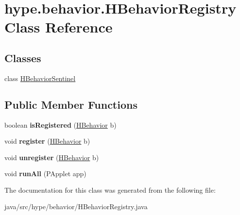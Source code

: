 \hypertarget{classhype_1_1behavior_1_1_h_behavior_registry}{\section{hype.\-behavior.\-H\-Behavior\-Registry Class Reference}
\label{classhype_1_1behavior_1_1_h_behavior_registry}
}
\subsection*{Classes}
\begin{DoxyCompactItemize}
\item 
class \hyperlink{classhype_1_1behavior_1_1_h_behavior_registry_1_1_h_behavior_sentinel}{H\-Behavior\-Sentinel}
\end{DoxyCompactItemize}
\subsection*{Public Member Functions}
\begin{DoxyCompactItemize}
\item 
\hypertarget{classhype_1_1behavior_1_1_h_behavior_registry_acce701fed8661171cd4ecf2e4b656b80}{boolean {\bfseries is\-Registered} (\hyperlink{classhype_1_1behavior_1_1_h_behavior}{H\-Behavior} b)}\label{classhype_1_1behavior_1_1_h_behavior_registry_acce701fed8661171cd4ecf2e4b656b80}

\item 
\hypertarget{classhype_1_1behavior_1_1_h_behavior_registry_a1d8925cea24b388f89b64b99096e3e19}{void {\bfseries register} (\hyperlink{classhype_1_1behavior_1_1_h_behavior}{H\-Behavior} b)}\label{classhype_1_1behavior_1_1_h_behavior_registry_a1d8925cea24b388f89b64b99096e3e19}

\item 
\hypertarget{classhype_1_1behavior_1_1_h_behavior_registry_a6671b7183cfe972c8d9925364b1cfa05}{void {\bfseries unregister} (\hyperlink{classhype_1_1behavior_1_1_h_behavior}{H\-Behavior} b)}\label{classhype_1_1behavior_1_1_h_behavior_registry_a6671b7183cfe972c8d9925364b1cfa05}

\item 
\hypertarget{classhype_1_1behavior_1_1_h_behavior_registry_a22baa812be153b26ff8c7cfed15cc255}{void {\bfseries run\-All} (P\-Applet app)}\label{classhype_1_1behavior_1_1_h_behavior_registry_a22baa812be153b26ff8c7cfed15cc255}

\end{DoxyCompactItemize}


The documentation for this class was generated from the following file\-:\begin{DoxyCompactItemize}
\item 
java/src/hype/behavior/H\-Behavior\-Registry.\-java\end{DoxyCompactItemize}
